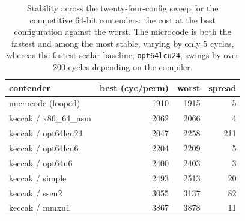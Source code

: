 \begin{table}[t]
\centering
\caption{Stability across the twenty-four-config sweep for the competitive
64-bit contenders: the cost at the best configuration against the worst. The
microcode is both the fastest and among the most stable, varying by only $5$
cycles, whereas the fastest scalar baseline, \texttt{opt64lcu24}, swings by over
$200$ cycles depending on the compiler.}
\label{tab:res-keccak-stability}
\small
\begin{tabular}{@{}lrrr@{}}
\toprule
contender & best (cyc/perm) & worst & spread \\
\midrule
microcode (looped)    & 1910 & 1915 & 5   \\
keccak / x86\_64\_asm & 2062 & 2066 & 4   \\
keccak / opt64lcu24   & 2047 & 2258 & 211 \\
keccak / opt64lcu6    & 2204 & 2209 & 5   \\
keccak / opt64u6      & 2400 & 2403 & 3   \\
keccak / simple       & 2493 & 2513 & 20  \\
keccak / sseu2        & 3055 & 3137 & 82  \\
keccak / mmxu1        & 3867 & 3878 & 11  \\
\bottomrule
\end{tabular}
\end{table}
